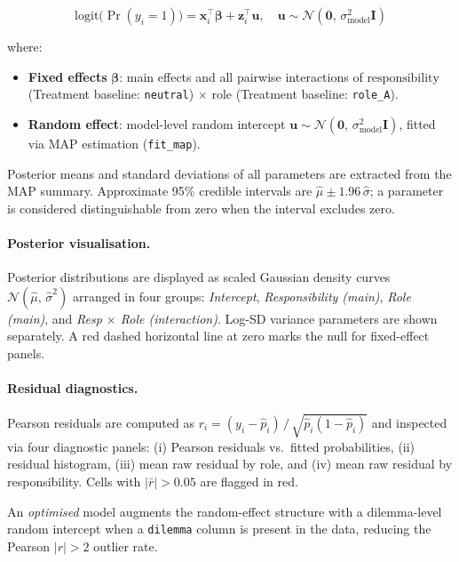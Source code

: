 \begin{equation}
    \text{logit}\bigl(\Pr(y_i = 1)\bigr)
    = \mathbf{x}_i^{\top}\boldsymbol{\beta} + \mathbf{z}_i^{\top}\mathbf{u},
    \quad \mathbf{u} \sim \mathcal{N}(\mathbf{0},\,\sigma^2_{\text{model}}\mathbf{I})
\end{equation}

\noindent where:
\begin{itemize}[noitemsep]
    \item \textbf{Fixed effects} $\boldsymbol{\beta}$: main effects and all pairwise
          interactions of $\text{responsibility}$ (Treatment baseline:
          \texttt{neutral}) $\times$ $\text{role}$ (Treatment baseline:
          \texttt{role\_A}).
    \item \textbf{Random effect}: model-level random intercept
          $\mathbf{u} \sim \mathcal{N}(\mathbf{0},\,\sigma^2_{\text{model}}\mathbf{I})$,
          fitted via MAP estimation (\texttt{fit\_map}).
\end{itemize}

Posterior means and standard deviations of all parameters are extracted from the MAP
summary.  Approximate 95\% credible intervals are $\hat{\mu} \pm 1.96\,\hat{\sigma}$; a
parameter is considered distinguishable from zero when the interval excludes zero.

\paragraph{Posterior visualisation.}
Posterior distributions are displayed as scaled Gaussian density curves
$\mathcal{N}(\hat{\mu},\,\hat{\sigma}^2)$ arranged in four groups:
\emph{Intercept}, \emph{Responsibility (main)}, \emph{Role (main)}, and
\emph{Resp $\times$ Role (interaction)}.  Log-SD variance parameters are shown separately.
A red dashed horizontal line at zero marks the null for fixed-effect panels.

\paragraph{Residual diagnostics.}
Pearson residuals are computed as
$r_i = (y_i - \hat{p}_i)\,/\,\sqrt{\hat{p}_i(1-\hat{p}_i)}$
and inspected via four diagnostic panels: (i) Pearson residuals vs.\ fitted probabilities,
(ii) residual histogram, (iii) mean raw residual by role, and (iv) mean raw residual by
responsibility.  Cells with $|\bar{r}| > 0.05$ are flagged in red.

An \emph{optimised} model augments the random-effect structure with a dilemma-level random
intercept when a \texttt{dilemma} column is present in the data, reducing the Pearson
$|r|>2$ outlier rate.

